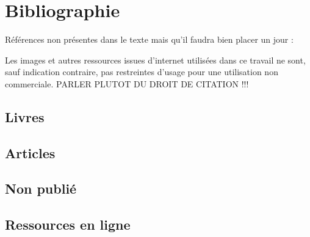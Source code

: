 \documentclass[12pt,fleqn,oneside,openany]{book} %
\begin{document}


\chapter{Bibliographie}
Références non présentes dans le texte mais qu'il faudra bien placer un jour : \cite{ref1} \cite{vidnul} \cite{vidcool} \cite{imgtitre} \cite{imgheader1} \cite{analysedonnees}

\begin{remark}
	Les images et autres ressources issues d'internet utilisées dans ce travail ne sont, sauf indication contraire, pas restreintes d'usage pour une utilisation non commerciale. PARLER PLUTOT DU DROIT DE CITATION !!!
\end{remark}

\section*{Livres}
\printbibliography[heading=bibempty,type=book]
\section*{Articles}
\printbibliography[heading=bibempty,type=article]
\section*{Non publié}
\printbibliography[heading=bibempty,type=unpublished]
\section*{Ressources en ligne}
\printbibliography[heading=bibempty,type=online]



\end{document}
